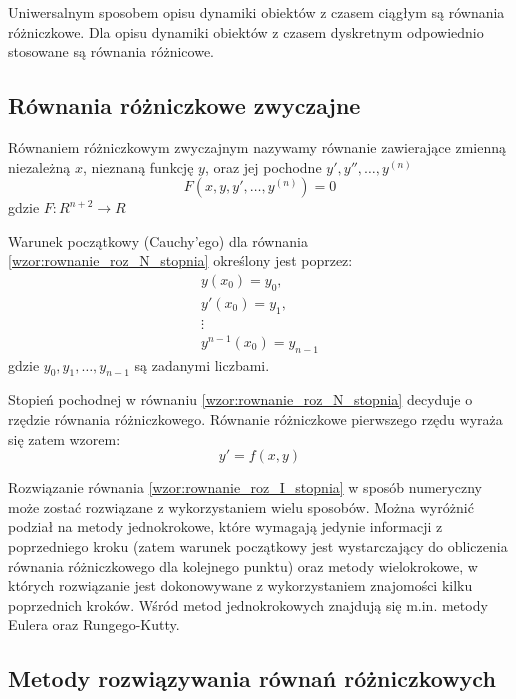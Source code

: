 Uniwersalnym sposobem opisu dynamiki obiektów z czasem ciągłym są równania różniczkowe. Dla opisu dynamiki obiektów z czasem dyskretnym odpowiednio stosowane są równania różnicowe\cite{Gutenbaum}.
\subsection{Równania różniczkowe zwyczajne}

Równaniem różniczkowym zwyczajnym nazywamy równanie zawierające zmienną niezależną $x$, nieznaną funkcję $y$, oraz jej pochodne $y', y'', \hdots, y^{(n)}$ \cite{BCh_2001}
\begin{equation}
	\label{wzor:rownanie_roz_N_stopnia}
	F(x,y,y',\hdots,y^{(n)}) = 0
\end{equation}
gdzie $F:R^{n+2} \rightarrow R$

Warunek początkowy (Cauchy'ego) dla równania \ref{wzor:rownanie_roz_N_stopnia} określony jest poprzez: 
\begin{equation}
\begin{array}{c}
y(x_0)       =  y_0,     \\
y'(x_0)      =  y_1,     \\
\vdots			   	     \\
y^{n-1}(x_0) = y_{n-1}
\end{array}
\end{equation}
gdzie $y_0, y_1, \hdots, y_{n-1}$ są zadanymi liczbami.

Stopień pochodnej w równaniu \ref{wzor:rownanie_roz_N_stopnia} decyduje o rzędzie równania różniczkowego. Równanie różniczkowe pierwszego rzędu wyraża się zatem wzorem:
\begin{equation}
	\label{wzor:rownanie_roz_I_stopnia}
	y' = f(x,y)
\end{equation}

Rozwiązanie równania \ref{wzor:rownanie_roz_I_stopnia} w sposób numeryczny może zostać rozwiązane z wykorzystaniem wielu sposobów. Można wyróżnić podział na metody jednokrokowe, które wymagają jedynie informacji z poprzedniego kroku (zatem warunek początkowy jest wystarczający do obliczenia równania różniczkowego dla kolejnego punktu) oraz metody wielokrokowe, w których rozwiązanie jest dokonowywane z wykorzystaniem znajomości kilku poprzednich kroków. Wśród metod jednokrokowych znajdują się m.in. metody Eulera oraz Rungego-Kutty.

\subsection{Metody rozwiązywania równań różniczkowych}

